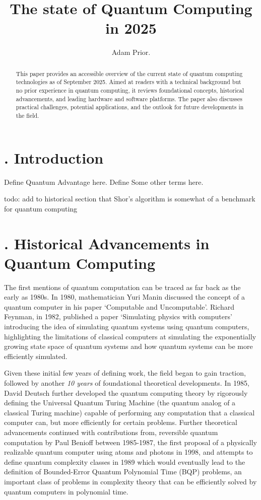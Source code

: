 \documentclass{elbioimp2}
\title{The state of Quantum Computing in 2025}
\author{Adam Prior.\affiliation{UrbanFox, Dublin, Ireland}}
\begin{document}
\setcounter{secnumdepth}{2}


\maketitle

\begin{abstract}
  This paper provides an accessible overview of the current state of quantum computing technologies
  as of September 2025. Aimed at readers with a technical background but no prior experience in quantum
  computing, it reviews foundational concepts, historical advancements, and leading hardware and software platforms. The paper
  also discusses practical challenges, potential applications, and the outlook for future developments in the field.

\end{abstract}

\section{. Introduction}
Define Quantum Advantage here.
Define Some other terms here.

todo: add to historical section that Shor's algorithm is somewhat of a benchmark for quantum computing


\section{. Historical Advancements in Quantum Computing}
The first mentions of quantum computation can be traced as far back as the early as 1980s.
In 1980, mathematician Yuri Manin discussed the concept of a quantum computer in his paper
`Computable and Uncomputable'\cite{Manin1980}. Richard Feynman, in 1982, published a paper
`Simulating physics with computers' introducing the idea of simulating
quantum systems using quantum computers\cite{Feynman1982}, highlighting the limitations
of classical computers at simulating the exponentially growing state space of quantum
systems and how quantum systems can be more efficiently simulated. 

Given these initial few years of defining work, the field began
to gain traction, followed by another \textit{10 years} of foundational theoretical developments.
In 1985, David Deutsch further developed the quantum computing theory by rigorously defining the
Universal Quantum Turing Machine (the quantum analog of a classical Turing machine) capable of
performing any computation that a classical computer can, but more efficiently for certain problems\cite{Deutsch1985}. 
Further theoretical advancements continued with contributions from, reversible quantum computation by Paul Benioff between
1985-1987\cite{BBenioff1987}, the first proposal of a physically realizable quantum computer 
using atoms and photons in 1998\cite{Yamamoto1998}, and attempts to define quantum complexity 
classes in 1989\cite{Bernstein1993} which would eventually lead to the definition of 
Bounded-Error Quantum Polynomial Time (BQP) problems, an important class of problems in complexity
theory that can be efficiently solved by quantum computers in polynomial time.
\end{document}
